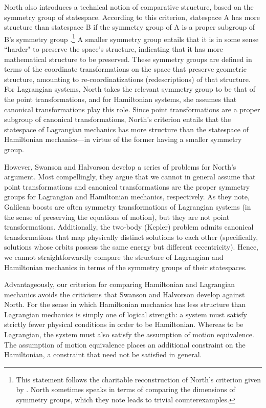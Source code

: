 \documentclass[letterpaper]{article}
\begin{document}
North also introduces a technical notion of comparative structure, based on the symmetry group of statespace. According to this criterion, statespace A has more structure than statespace B if the symmetry group of A is a proper subgroup of B's symmetry group \parencites[87-88]{North}.\footnote{This statement follows the charitable reconstruction of North's criterion given by \textcites[]{Swanson}. North sometimes speaks in terms of comparing the dimensions of symmetry groups, which they note leads to trivial counterexamples.} A smaller symmetry group entails that it is in some sense ``harder" to preserve the space's structure, indicating that it has more mathematical structure to be preserved. These symmetry groups are defined in terms of the coordinate transformations on the space that preserve geometric structure, amounting to re-coordinatizations (redescriptions) of that structure. For Lagrangian systems, North takes the relevant symmetry group to be that of the point transformations, and for Hamiltonian systems, she assumes that canonical transformations play this role. Since point transformations are a proper subgroup of canonical transformations, North's criterion entails that the statespace of Lagrangian mechanics has more structure than the statespace of Hamiltonian mechanics---in virtue of the former having a smaller symmetry group. 

However, Swanson and Halvorson \parencites*[]{Swanson} develop a series of problems for North's argument. Most compellingly, they argue that we cannot in general assume that point transformations and canonical transformations are the proper symmetry groups for Lagrangian and Hamiltonian mechanics, respectively. As they note, Galilean boosts are often symmetry transformations of Lagrangian systems (in the sense of preserving the equations of motion), but they are not point transformations. Additionally, the two-body (Kepler) problem admits canonical transformations that map physically distinct solutions to each other (specifically, solutions whose orbits possess the same energy but different eccentricity). Hence, we cannot straightforwardly compare the structure of Lagrangian and Hamiltonian mechanics in terms of the symmetry groups of their statespaces. 

Advantageously, our criterion for comparing Hamiltonian and Lagrangian mechanics avoids the criticisms that Swanson and Halvorson develop against North. For the sense in which Hamiltonian mechanics has less structure than Lagrangian mechanics is simply one of logical strength: a system must satisfy strictly fewer physical conditions in order to be Hamiltonian. Whereas to be Lagrangian, the system must also satisfy the assumption of motion equivalence. The assumption of motion equivalence places an additional constraint on the Hamiltonian, a constraint that need not be satisfied in general. 
\end{document}
